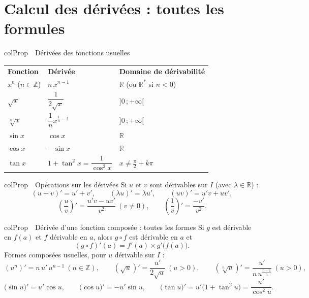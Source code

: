 \documentclass[11pt,a4paper]{article}
\newenvironment{propriete}[1][Propriété]
  {\begin{fiche}{colProp}{\ding{72}~~#1}}{\end{fiche}}
\begin{document}
\section{Calcul des dérivées : toutes les formules}

\begin{propriete}[Dérivées des fonctions usuelles]
\begin{center}
\renewcommand{\arraystretch}{1.5}
\sffamily\small
\begin{tabular}{>{\centering\arraybackslash}p{3.6cm} >{\centering\arraybackslash}p{4.4cm} >{\centering\arraybackslash}p{6.4cm}}
\rowcolor{qtealdark} \color{white}\bfseries Fonction & \color{white}\bfseries Dérivée & \color{white}\bfseries Domaine de dérivabilité \\
\rowcolor{tealpale} $x^n$ ($n \in \mathbb{Z}$) & $n\,x^{n-1}$ & $\mathbb{R}$ (ou $\mathbb{R}^*$ si $n < 0$) \\
$\sqrt{x}$ & $\dfrac{1}{2\sqrt{x}}$ & $]0\,;+\infty[$ \\
\rowcolor{tealpale} $\sqrt[n]{x}$ & $\dfrac{1}{n}x^{\frac{1}{n}-1}$ & $]0\,;+\infty[$ \\
$\sin x$ & $\cos x$ & $\mathbb{R}$ \\
\rowcolor{tealpale} $\cos x$ & $-\sin x$ & $\mathbb{R}$ \\
$\tan x$ & $1 + \tan^2 x = \dfrac{1}{\cos^2 x}$ & $x \neq \frac{\pi}{2} + k\pi$ \\
\end{tabular}
\end{center}
\end{propriete}

\begin{propriete}[Opérations sur les dérivées]
Si $u$ et $v$ sont dérivables sur $I$ (avec $\lambda \in \mathbb{R}$) :
\[
  (u + v)' = u' + v', \qquad
  (\lambda u)' = \lambda u', \qquad
  (uv)' = u'v + uv',
\]
\[
  \left(\frac{u}{v}\right)' = \frac{u'v - uv'}{v^2} \ (v \neq 0), \qquad
  \left(\frac{1}{v}\right)' = \frac{-v'}{v^2}.
\]
\end{propriete}

\begin{propriete}[Dérivée d'une fonction composée : toutes les formes]
Si $g$ est dérivable en $f(a)$ et $f$ dérivable en $a$, alors $g \circ f$ est dérivable en $a$ et
\[
  (g \circ f)'(a) = f'(a) \times g'\bigl(f(a)\bigr).
\]
Formes composées usuelles, pour $u$ dérivable sur $I$ :
\[
  (u^n)' = n\,u'\,u^{n-1} \ (n \in \mathbb{Z}), \qquad
  \left(\sqrt{u}\right)' = \frac{u'}{2\sqrt{u}} \ (u > 0), \qquad
  \left(\sqrt[n]{u}\right)' = \frac{u'}{n\,u^{\frac{n-1}{n}}} \ (u > 0),
\]
\[
  \bigl(\sin u\bigr)' = u'\cos u, \qquad
  \bigl(\cos u\bigr)' = -u'\sin u, \qquad
  \bigl(\tan u\bigr)' = u'\bigl(1 + \tan^2 u\bigr) = \frac{u'}{\cos^2 u}.
\]
\end{propriete}
\end{document}
